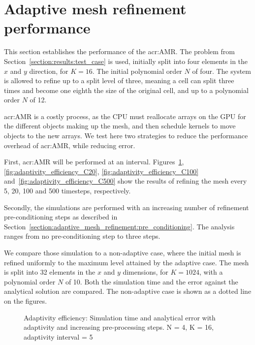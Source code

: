 \section{Adaptive mesh refinement performance} \label{section:results:adaptivity_performance}

This section establishes the performance of the \acrlong{acr:AMR}. The problem from
Section~\ref{section:results:test_case} is used, initially split into four elements in the $x$ and
$y$ direction, for $K = 16$. The initial polynomial order $N$ of four. The system is allowed to
refine up to a split level of three, meaning a cell can split three times and become one eighth the
size of the original cell, and up to a polynomial order $N$ of 12.

\Acrlong{acr:AMR} is a costly process, as the CPU must reallocate arrays on the GPU for the
different objects making up the mesh, and then schedule kernels to move objects to the new arrays.
We test here two strategies to reduce the performance overhead of \acrlong{acr:AMR}, while reducing
error. 

First, \acrlong{acr:AMR} will be performed at an interval.
Figures~\ref{fig:adaptivity_efficiency_C5}, \ref{fig:adaptivity_efficiency_C20},
\ref{fig:adaptivity_efficiency_C100} and~\ref{fig:adaptivity_efficiency_C500} show the results of
refining the mesh every 5, 20, 100 and 500 timesteps, respectively.

Secondly, the simulations are performed with an increasing number of refinement pre-conditioning
steps as described in Section~\ref{section:adaptive_mesh_refinement:pre_conditioning}. The analysis
ranges from no pre-conditioning step to three steps.

We compare those simulation to a non-adaptive case, where the initial mesh is refined uniformly to
the maximum level attained by the adaptive case. The mesh is split into 32 elements in the $x$ and
$y$ dimensions, for $K = 1024$, with a polynomial order $N$ of 10. Both the simulation time and the
error against the analytical solution are compared. The non-adaptive case is shown as a dotted line
on the figures.

\begin{figure}[H]
	\centering
	
	\caption{Adaptivity efficiency: Simulation time and analytical error with adaptivity and increasing pre-processing steps. N = 4, K = 16, adaptivity interval = 5}
	\label{fig:adaptivity_efficiency_C5}
\end{figure}

